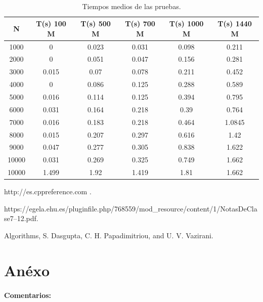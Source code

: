 \documentclass[es]{ifirak}
\begin{document}
\paragraph{}
\begin{center}
	\begin{table}[htbp]
		\centering
		\begin{tabular}{c|c|c|c|c|c}
			N & T(s) 100 M & T(s) 500 M & T(s) 700 M& T(s) 1000 M & T(s) 1440 M \\
			\hline
			1000&	0&			0.023& 	0.031& 0.098 & 	0.211\\
			2000&	0&			0.051& 0.047& 	0.156 & 0.281\\
			3000&   0.015&		0.07& 0.078& 0.211 & 0.452\\
			4000&	0&			0.086& 0.125&	0.288 & 0.589 \\
			5000&	0.016&		0.114& 0.125& 0.394 & 0.795\\
			6000&	0.031&		0.164& 0.218& 0.39 & 0.764\\
			7000&	0.016&		0.183& 0.218& 0.464 & 1.0845\\
			8000&	0.015&		0.207& 0.297& 0.616 & 	1.42\\
			9000&	0.047&		0.277& 0.305 & 0.838 &	1.622\\
			10000&	0.031&		0.269& 0.325 & 0.749 & 	1.662\\

		10000&	1.499&	1.92&	1.419&	1.81&	1.662\\
		\end{tabular}
		\caption{Tiempos medios de las pruebas. }\label{table}
	\end{table}
\end{center}


\begin{thebibliography}{arauak}
	
	 http://es.cppreference.com .
	
	 https://egela.ehu.es/pluginfile.php/768559/mod\_resource/content/1/NotasDeClase7--12.pdf.
	
	 Algorithms, S. Dasgupta, C. H. Papadimitriou, and U. V. Vazirani.
	
\end{thebibliography}


\section{Anéxo}
\paragraph{Comentarios:}
\end{document}
